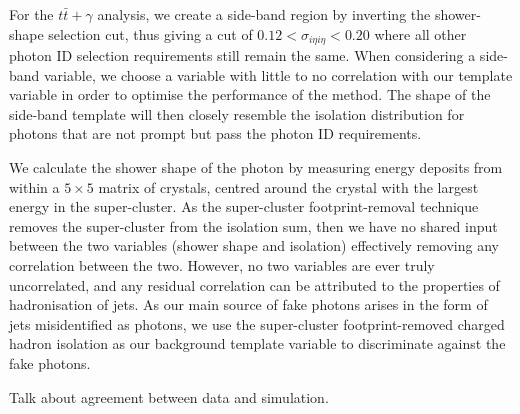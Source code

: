 For the $t\bar{t}+\gamma$ analysis, we create a side-band region by inverting the shower-shape selection cut, thus giving a cut of $0.12 < \sigma_{i \eta i \eta} < 0.20$ where all other photon ID selection requirements still remain the same. When considering a side-band variable, we choose a variable with little to no correlation with our template variable in order to optimise the performance of the method. The shape of the side-band template will then closely resemble the isolation distribution for photons that are not prompt but pass the photon ID requirements. 

We calculate the shower shape of the photon by measuring energy deposits from within a $5 \times 5$ matrix of crystals, centred around the crystal with the largest energy in the super-cluster. As the super-cluster footprint-removal technique removes the super-cluster from the isolation sum, then we have no shared input between the two variables (shower shape and isolation) effectively removing any correlation between the two. However, no two variables are ever truly uncorrelated, and any residual correlation can be attributed to the properties of hadronisation of jets. As our main source of fake photons arises in the form of jets misidentified as photons, we use the super-cluster footprint-removed charged hadron isolation as our background template variable to discriminate against the fake photons.

Talk about agreement between data and simulation. 

